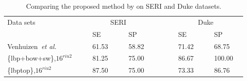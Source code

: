\begin{tiny}
\begin{table}[t]
\caption{Comparing the proposed method by \cite{Venhuizen2015} on SERI and Duke datasets.}%
\centering
\begin{tabular}{lcclcclcccclcclc}
\toprule
Data sets 	& & &\multicolumn{4}{c}{SERI}& & & & &\multicolumn{4}{c}{Duke} & \\
  \cmidrule(l){2-8}  \cmidrule(l){10-16}
	         & & & SE & & & SP & & & & & SE & & & SP & \\
\midrule
Venhuizen~\textit{et al.} \cite{Venhuizen2015} 		& & & 61.53 & & & 58.82 & & & & & 71.42 & & & 68.75 & \\
\{\ac{lbp}+\ac{bow}+\ac{sw}\},$16^{riu2}$ 	& & & 81.25 & & & 75.00 & & & & & 86.67 & & & 100.00 &  \\
\{\ac{lbptop}\},$16^{riu2}$				& & & 87.50 & & & 75.00 & & & & & 73.33 & & & 86.76 &  \\


\bottomrule
\end{tabular}
\label{tab:Table3}
\end{table}
\end{tiny}